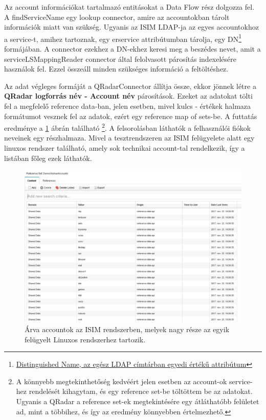 Az account információkat tartalmazó entitásokat a Data Flow rész dolgozza fel. A findServiceName egy lookup connector, amire az accountokban tárolt információk miatt van szükség. Ugyanis az ISIM LDAP-ja az egyes accountokhoz a service-t, amihez tartoznak, egy erservice attribútumban tárolja, egy DN\footnote{\href{https://www.ldap.com/ldap-dns-and-rdns}{Distinguished Name, az egész LDAP címtárban egyedi értékű attribútum}} formájában. A connector ezekhez a DN-ekhez keresi meg a beszédes nevet, amit a serviceLSMappingReader connector által felolvasott párosítás indexelésére használok fel. Ezzel összeáll minden szükséges információ a feltöltéshez.

Az adat végleges formáját a QRadarConnector állítja össze, ekkor jönnek létre a \textbf{QRadar logforrás név - Account név } párosítások. Ezeket az adatokat tölti fel a megfelelő reference data-ban, jelen esetben, mivel kulcs - értékek halmaza formátumot vesznek fel az adatok, ezért egy reference map of sets-be. A futtatás eredménye a \ref{fig:orphanaccountresult} ábrán található
\footnote{A könnyebb megtekinthetőség kedvéért jelen esetben az account-ok service-hez rendelését kihagytam, és egy reference set-be töltöttem be az adatokat. Ugyanis a QRadar a reference set-ek megtekintésére egy átláthatóbb felületet ad, mint a többihez, és így az eredmény könnyebben értelmezhető.}. 
A felsorolásban láthatók a felhasználói fiókok neveinek egy részhalmaza. Mivel a tesztrendszeren az ISIM felügyelete alatt egy linuxos rendszer található, amely sok technikai account-tal rendelkezik, így a listában főleg ezek láthatók.

\begin{figure}[h]
	\centering
	\includegraphics[width=0.9\linewidth]{figures/conn_test/orphanAccountResult}
	\caption{Árva accountok az ISIM rendszerben, melyek nagy része az egyik felügyelt Linuxos rendszerhez tartozik.}
	\label{fig:orphanaccountresult}
\end{figure}

